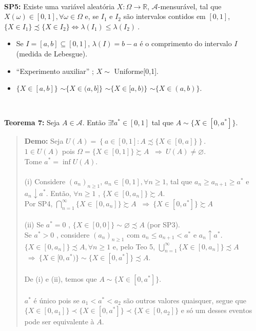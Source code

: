 \documentclass[
]{book}
\begin{document}
\(~\)

\textbf{SP5:} Existe uma variável aleatória \(X: \Omega \longrightarrow \mathbb{R}\), \(\mathcal{A}\)-mensurável, tal que \(X(\omega) \in [0,1], \forall \omega \in \Omega\) e, se \(I_1\) e \(I_2\) são intervalos contidos em \([0,1]\), \(\{X \in I_1\} \precsim \{X \in I_2\} \Leftrightarrow \lambda(I_1) \leq \lambda(I_2)~.\)

\begin{itemize}
\item
  Se \(I=[a,b] \subseteq [0,1]\), \(\lambda(I) = b-a\) é o comprimento do intervalo \(I\) (medida de Lebesgue).
\item
  ``Experimento auxiliar'' ; \(X \sim\) Uniforme{[}0,1{]}.
\item
  \(\{X \in [a,b]\}\) \(\sim \{X \in (a,b]\}\) \(\sim \{X \in [a,b)\}\) \(\sim \{X \in (a,b)\}\).
\end{itemize}

\(~\)

\textbf{Teorema 7:} Seja \(A \in \mathcal{A}\). Então \(\exists! a^* \in [0,1]\) tal que \(A \sim \{X \in [0,a^*]\}\).

\begin{quote}
\textbf{Demo:} Seja \(U(A) = \left\{ a \in [0,1] : A \precsim \{X \in [0,a]\} \right\}\).\\
\(1 \in U(A)\) pois \(\Omega = \{X \in [0,1]\} \succsim A\) \(~\Rightarrow~ U(A) \neq \varnothing\).\\
Tome \(a^* = \inf U(A)\).\\
\(~\)\\
(i) Considere \((a_n)_{n \geq 1}\), \(a_n \in [0,1], \forall n \geq 1\), tal que \(a_n \geq a_{n+1} \geq a^*\) e \(a_n \downarrow a^*\). Então, \(\forall n \geq 1\) , \(\{X \in [0,a_n]\} \succsim A\).\\
Por SP4, \(\displaystyle \bigcap_{n=1}^\infty \{X \in [0,a_n]\} \succsim A\) \(~\Rightarrow~ \{X \in [0,a^*]\} \succsim A\)\\
\(~\)\\
(ii) Se \(a^*=0\) , \(\{X \in [0,0]\} \sim \varnothing \precsim A\) (por SP3).\\
Se \(a^* > 0\) , considere \((a_n)_{n \geq 1}\) com \(a_n \leq a_{n+1} < a^*\) e \(a_n \uparrow a^*\).\\
\(\{X \in [0,a_n]\} \precsim A, \forall n \geq 1\) e, pelo Teo 5, \(\displaystyle \bigcup_{n=1}^{\infty} \{X \in [0,a_n]\} \precsim A\) \(~\Rightarrow~ \{X \in [0,a^*)\} \sim \{X \in [0,a^*]\} \precsim A\).\\
\(~\)\\
De (i) e (ii), temos que \(A \sim \{X \in [0,a^*]\}\).\\
\(~\)\\
\(a^*\) é único pois se \(a_1 < a^* < a_2\) são outros valores quaisquer, segue que \(\{X \in [0,a_1]\} \prec \{X \in [0,a^*]\} \prec \{X \in [0,a_2]\}\) e só um desses eventos pode ser equivalente à \(A\).
\end{quote}
\end{document}
